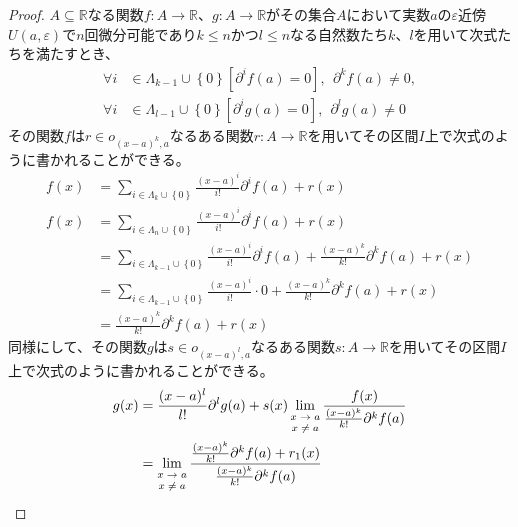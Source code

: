 \documentclass[dvipdfmx]{jsarticle}
\begin{document}
\begin{proof}
$A \subseteq \mathbb{R}$なる関数$f:A \rightarrow \mathbb{R}$、$g:A \rightarrow \mathbb{R}$がその集合$A$において実数$a$の$\varepsilon$近傍$U(a,\varepsilon)$で$n$回微分可能であり$k \leq n$かつ$l \leq n$なる自然数たち$k$、$l$を用いて次式たちを満たすとき、
\begin{align*}
\forall i &\in \varLambda_{k - 1} \cup \left\{ 0 \right\}\left[ \partial^{i}f(a) = 0 \right],\ \ \partial^{k}f(a) \neq 0,\\
\forall i &\in \varLambda_{l - 1} \cup \left\{ 0 \right\}\left[ \partial^{i}g(a) = 0 \right],\ \ \partial^{l}g(a) \neq 0
\end{align*}
その関数$f$は$r \in o_{(x - a)^{k},a}$なるある関数$r:A \rightarrow \mathbb{R}$を用いてその区間$I$上で次式のように書かれることができる。
\begin{align*}
f(x) &= \sum_{i \in \varLambda_{k} \cup \left\{ 0 \right\}} {\frac{(x - a)^{i}}{i!}\partial^{i}f(a)} + r(x)\\
f(x) &= \sum_{i \in \varLambda_{n} \cup \left\{ 0 \right\}} {\frac{(x - a)^{i}}{i!}\partial^{i}f(a)} + r(x)\\
&= \sum_{i \in \varLambda_{k - 1} \cup \left\{ 0 \right\}} {\frac{(x - a)^{i}}{i!}\partial^{i}f(a)} + \frac{(x - a)^{k}}{k!}\partial^{k}f(a) + r(x)\\
&= \sum_{i \in \varLambda_{k - 1} \cup \left\{ 0 \right\}} {\frac{(x - a)^{i}}{i!} \cdot 0} + \frac{(x - a)^{k}}{k!}\partial^{k}f(a) + r(x) \\
&= \frac{(x - a)^{k}}{k!}\partial^{k}f(a) + r(x)
\end{align*}
同様にして、その関数$g$は$s \in o_{(x - a)^{l},a}$なるある関数$s:A \rightarrow \mathbb{R}$を用いてその区間$I$上で次式のように書かれることができる。
\begin{align*}
g(x) &= \frac{(x - a)^{l}}{l!}\partial^{l}g(a) + s(x)
\lim_{\scriptsize \begin{matrix}
x \rightarrow a \\
x \neq a \\
\end{matrix}}\frac{f(x)}{\frac{(x - a)^{k}}{k!}\partial^{k}f(a)} \\
&= \lim_{\scriptsize \begin{matrix}
x \rightarrow a \\
x \neq a \\
\end{matrix}}\frac{\frac{(x - a)^{k}}{k!}\partial^{k}f(a) + r_{1}(x)}{\frac{(x - a)^{k}}{k!}\partial^{k}f(a)}\\

\end{align*}
\end{proof}
\end{document}
